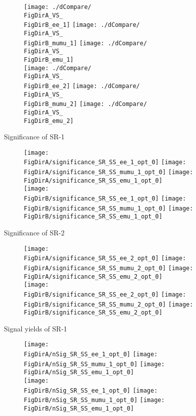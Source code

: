 \begin{frame}
  \begin{figure}
    \centering
    \texttt{[image: ./dCompare/\\FigDirA\_VS\_\\FigDirB\_ee\_1]}
    \texttt{[image: ./dCompare/\\FigDirA\_VS\_\\FigDirB\_mumu\_1]}
    \texttt{[image: ./dCompare/\\FigDirA\_VS\_\\FigDirB\_emu\_1]}\\
    \texttt{[image: ./dCompare/\\FigDirA\_VS\_\\FigDirB\_ee\_2]}
    \texttt{[image: ./dCompare/\\FigDirA\_VS\_\\FigDirB\_mumu\_2]}
    \texttt{[image: ./dCompare/\\FigDirA\_VS\_\\FigDirB\_emu\_2]}
  \end{figure}
\end{frame}

\begin{frame}{Significance of SR-1}
  \begin{figure}
    \centering
    \texttt{[image: \\FigDirA/significance\_SR\_SS\_ee\_1\_opt\_0]}
    \texttt{[image: \\FigDirA/significance\_SR\_SS\_mumu\_1\_opt\_0]}
    \texttt{[image: \\FigDirA/significance\_SR\_SS\_emu\_1\_opt\_0]}\\
    \texttt{[image: \\FigDirB/significance\_SR\_SS\_ee\_1\_opt\_0]}
    \texttt{[image: \\FigDirB/significance\_SR\_SS\_mumu\_1\_opt\_0]}
    \texttt{[image: \\FigDirB/significance\_SR\_SS\_emu\_1\_opt\_0]}
  \end{figure}
\end{frame}

\begin{frame}{Significance of SR-2}
  \begin{figure}
    \centering
    \texttt{[image: \\FigDirA/significance\_SR\_SS\_ee\_2\_opt\_0]}
    \texttt{[image: \\FigDirA/significance\_SR\_SS\_mumu\_2\_opt\_0]}
    \texttt{[image: \\FigDirA/significance\_SR\_SS\_emu\_2\_opt\_0]}\\
    \texttt{[image: \\FigDirB/significance\_SR\_SS\_ee\_2\_opt\_0]}
    \texttt{[image: \\FigDirB/significance\_SR\_SS\_mumu\_2\_opt\_0]}
    \texttt{[image: \\FigDirB/significance\_SR\_SS\_emu\_2\_opt\_0]}
  \end{figure}
\end{frame}

\begin{frame}{Signal yields of SR-1}
  \begin{figure}
    \centering
    \texttt{[image: \\FigDirA/nSig\_SR\_SS\_ee\_1\_opt\_0]}
    \texttt{[image: \\FigDirA/nSig\_SR\_SS\_mumu\_1\_opt\_0]}
    \texttt{[image: \\FigDirA/nSig\_SR\_SS\_emu\_1\_opt\_0]}\\
    \texttt{[image: \\FigDirB/nSig\_SR\_SS\_ee\_1\_opt\_0]}
    \texttt{[image: \\FigDirB/nSig\_SR\_SS\_mumu\_1\_opt\_0]}
    \texttt{[image: \\FigDirB/nSig\_SR\_SS\_emu\_1\_opt\_0]}
  \end{figure}
\end{frame}

